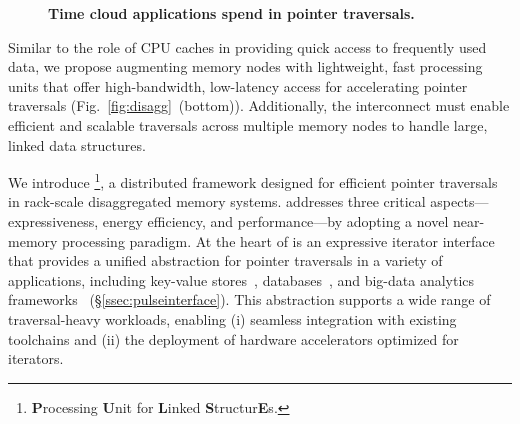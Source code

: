 \begin{figure}[ht!]
    \centering
    \caption[Time cloud applications spend in pointer traversals.]{\textbf{Time cloud applications spend in pointer traversals.}} 
    \label{fig:motivation}
\end{figure}

Similar to the role of CPU caches in providing quick access to frequently used data, we propose augmenting memory nodes with lightweight, fast processing units that offer high-bandwidth, low-latency access for accelerating pointer traversals (Fig.~\ref{fig:disagg}~(bottom)). Additionally, the interconnect must enable efficient and scalable traversals across multiple memory nodes to handle large, linked data structures.

We introduce \pulse\footnote{\textbf{P}rocessing \textbf{U}nit for \textbf{L}inked \textbf{S}tructur\textbf{E}s.}, a distributed framework designed for efficient pointer traversals in rack-scale disaggregated memory systems. \pulse addresses three critical aspects—expressiveness, energy efficiency, and performance—by adopting a novel near-memory processing paradigm. At the heart of \pulse is an expressive iterator interface that provides a unified abstraction for pointer traversals in a variety of applications, including key-value stores~\cite{redis, memcached}, databases~\cite{wiredtiger, btree1, btree2, trie1, trie3}, and big-data analytics frameworks~\cite{powergraph, graphx, graphchi, pagerank} (\S\ref{ssec:pulseinterface}). This abstraction supports a wide range of traversal-heavy workloads, enabling (i) seamless integration with existing toolchains and (ii) the deployment of hardware accelerators optimized for iterators.

